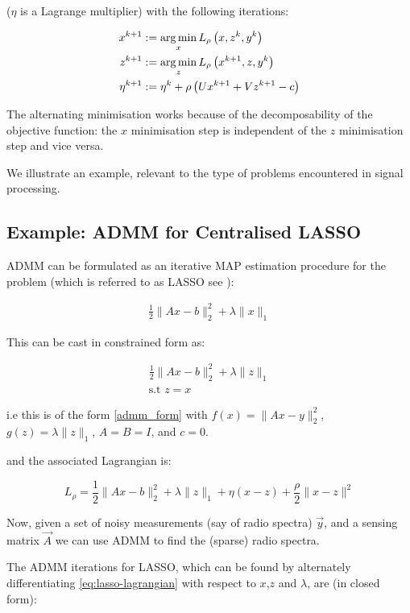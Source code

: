 \documentclass[conference]{IEEEtran}
\begin{document}
(\(\eta\) is a Lagrange multiplier) with the following iterations:

\begin{align}
x^{k+1} &:= \argmin_{x} L_\rho\left(x,z^k,y^k\right)\\
z^{k+1} &:= \argmin_{z} L_\rho\left(x^{k+1},z,y^k\right)\\
\eta^{k+1} &:= \eta^{k} + \rho \left(Ux^{k+1} + Vz^{k+1} - c\right)
\label{admm_algo}
\end{align}

The alternating minimisation works because of the decomposability of the objective function: the \(x\) minimisation step is independent of the \(z\) minimisation step and vice versa.  

We illustrate an example, relevant to the type of problems encountered in signal processing.

\subsection{Example: ADMM for Centralised LASSO}
ADMM can be formulated as an iterative MAP estimation procedure for the problem (which is referred to as LASSO see \cite{tibshirani1996regression}):

\begin{eqnarray}
\frac{1}{2}\|Ax-b\|_2^2 + \lambda\|x\|_1
\end{eqnarray}

This can be cast in constrained form as:

\begin{eqnarray}
\frac{1}{2}\|Ax-b\|_2^2 + \lambda\|z\|_1 \\
\text{s.t } z = x
\end{eqnarray}

i.e this is of the form \eqref{admm_form} with \( f\left(x\right) =\|Ax-y\|_2^2\), \(g\left(z\right) = \lambda\|z\|_1\), \(A=B=I\), and \(c=0\).

and the associated Lagrangian is:

\begin{equation}
L_\rho = \frac{1}{2}\|Ax-b\|_2^2 + \lambda\|z\|_1 + \eta\left(x-z\right) + \frac{\rho}{2}\|x-z\|^2
\label{eq:lasso-lagrangian}
\end{equation}

Now, given a set of noisy measurements (say of radio spectra) \(\vec{y}\), and a sensing matrix \(\vec{A}\) we can use ADMM to find the (sparse) radio spectra.

The ADMM iterations for LASSO, which can be found by alternately differentiating \eqref{eq:lasso-lagrangian} with respect to \(x\),\(z\) and \(\lambda\), are (in closed form):
\end{document}
